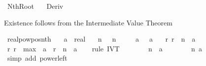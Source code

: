 %
\begin{isabellebody}%
%
%
\isadelimdocument
%
\endisadelimdocument
%
\isatagdocument
%
\isamarkuptrue%
%
\endisatagdocument
{\isafolddocument}%
%
\isadelimdocument
%
\endisadelimdocument
%
\isadelimtheory
%
\endisadelimtheory
%
\isatagtheory
{}\isamarkupfalse%
\ NthRoot\isanewline
\ \ \ Deriv\isanewline
{}%
\endisatagtheory
{\isafoldtheory}%
%
\isadelimtheory
%
\endisadelimtheory
%
\isadelimdocument
%
\endisadelimdocument
%
\isatagdocument
%
\isamarkuptrue%
%
\endisatagdocument
{\isafolddocument}%
%
\isadelimdocument
%
\endisadelimdocument
%
\begin{isamarkuptext}%
Existence follows from the Intermediate Value Theorem%
\end{isamarkuptext}\isamarkuptrue%
\isamarkupfalse%
\ realpow{\isacharunderscore}{\kern0pt}pos{\isacharunderscore}{\kern0pt}nth{\isacharcolon}{\kern0pt}\isanewline
\ \ \ a\ {\isacharcolon}{\kern0pt}{\isacharcolon}{\kern0pt}\ real\isanewline
\ \ \ n{\isacharcolon}{\kern0pt}\ {\isachardoublequoteopen}{}\ {\isacharless}{\kern0pt}\ n{\isachardoublequoteclose}\isanewline
\ \ \ \ \ a{\isacharcolon}{\kern0pt}\ {\isachardoublequoteopen}{}\ {\isacharless}{\kern0pt}\ a{\isachardoublequoteclose}\isanewline
\ \ \ {\isachardoublequoteopen}{\isasymexists}r{\isachargreater}{\kern0pt}{}{\isachardot}{\kern0pt}\ r\ {\isacharcircum}{\kern0pt}\ n\ {\isacharequal}{\kern0pt}\ a{\isachardoublequoteclose}\isanewline
%
\isadelimproof
%
\endisadelimproof
%
\isatagproof
{}\isamarkupfalse%
\ {\isacharminus}{\kern0pt}\isanewline
\ \ \isamarkupfalse%
\ {\isachardoublequoteopen}{\isasymexists}r{\isasymge}{}{\isachardot}{\kern0pt}\ r\ {\isasymle}\ {\isacharparenleft}{\kern0pt}max\ {}\ a{\isacharparenright}{\kern0pt}\ {\isasymand}\ r\ {\isacharcircum}{\kern0pt}\ n\ {\isacharequal}{\kern0pt}\ a{\isachardoublequoteclose}\isanewline
\ \ \isamarkupfalse%
\ {\isacharparenleft}{\kern0pt}rule\ IVT{\isacharparenright}{\kern0pt}\isanewline
\ \ \ \ \isamarkupfalse%
\ {\isachardoublequoteopen}{}\ {\isacharcircum}{\kern0pt}\ n\ {\isasymle}\ a{\isachardoublequoteclose}\isanewline
\ \ \ \ \ \ \isamarkupfalse%
\ n\ a\ \isamarkupfalse%
\ {\isacharparenleft}{\kern0pt}simp\ add{\isacharcolon}{\kern0pt}\ power{\isacharunderscore}{\kern0pt}{}{\isacharunderscore}{\kern0pt}left{\isacharparenright}{\kern0pt}\isanewline

\end{isabellebody}
